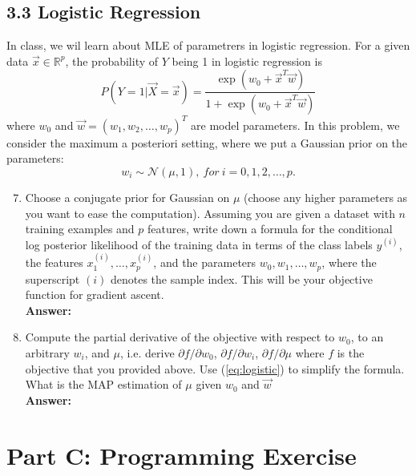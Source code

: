\documentclass{article}
\begin{document}
\subsection*{3.3 Logistic Regression}

In class, we wil learn about MLE of parametrers in logistic regression. For a given data $\vec{x}\in \mathbb{R}^p$, the probability of $Y$ being 1 in logistic regression is
\begin{equation}
\label{eq:logistic}
P(Y=1|\vec{X}=\vec{x})=\frac{\exp(w_0+\vec{x}^T\vec{w})}{1+\exp(w_0+\vec{x}^T\vec{w})}
\end{equation}
where $w_0$ and $\vec{w}=(w_1,w_2,\dots,w_p)^T$ are model parameters. In this problem, we consider the maximum a posteriori setting, where we put a Gaussian prior on the parameters:
$$w_i\sim \mathcal{N}(\mu,1),~for~i=0,1,2,\dots,p.$$

\begin{enumerate}
	\setcounter{enumi}{6}
	\item Choose a conjugate prior for Gaussian on $\mu$ (choose any higher parameters as you want to ease the computation). Assuming you are given a dataset with $n$ training examples and $p$ features, write down a formula for the conditional log posterior likelihood of the training data in terms of the class labels $y^{(i)}$, the features $x_1^{(i)},\dots,x_p^{(i)}$, and the parameters $w_0,w_1,\dots,w_p$, where the superscript $(i)$ denotes the sample index. This will be your objective function for gradient ascent.
	\\\textbf{Answer:}
	
	\item Compute the partial derivative of the objective with respect to $w_0$, to an arbitrary $w_i$, and $\mu$, i.e. derive $\partial f/\partial w_0$, $\partial f/\partial w_i$, $\partial f/\partial \mu$ where $f$ is the objective that you provided above. Use (\ref{eq:logistic}) to simplify the formula. What is the MAP estimation of $\mu$ given $w_0$ and $\vec{w}$
	\\\textbf{Answer:}
\end{enumerate}

\newpage

\section*{Part C: Programming Exercise}
\newpage
\end{document}
